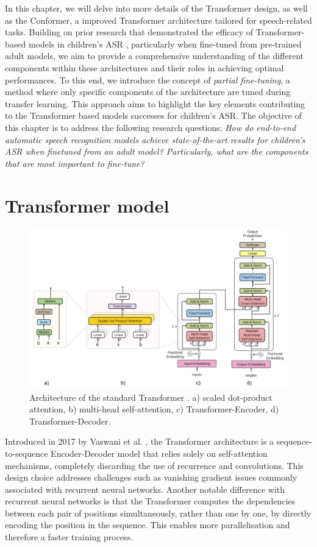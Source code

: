 In this chapter, we will delve into more details of the Transformer design, as well as the Conformer, a improved Transformer architecture tailored for speech-related tasks. Building on prior research that demonstrated the efficacy of Transformer-based models in children's \ac{ASR} \cite{gelin2021endtoend}, particularly when fine-tuned from pre-trained adult models, we aim to provide a comprehensive understanding of the different components within these architectures and their roles in achieving optimal performances. To this end, we introduce the concept of \textit{partial fine-tuning}, a method where only specific components of the architecture are tuned during transfer learning. This approach aims to highlight the key elements contributing to the Transformer based models successes for children's \ac{ASR}. The objective of this chapter is to address the following research questions: \textit{How do end-to-end automatic speech recognition models achieve state-of-the-art results for children's ASR when finetuned from an adult model?  Particularly, what are the components that are most important to fine-tune?}
\section{Transformer model}
\label{sec:trans_archi}

\begin{figure}[ht]
    \centering
    \includegraphics[width=1\textwidth]{imgs/Transformer_archi.png}
    \caption{Architecture of the standard Transformer \cite{vaswani2017attention}. a) scaled dot-product attention, b) multi-head self-attention, c) Transformer-Encoder, d) Transformer-Decoder.}
    \label{fig:Transformer_archi}
\end{figure}
Introduced in 2017 by Vaswani et al. \cite{vaswani2017attention}, the Transformer architecture is a sequence-to-sequence Encoder-Decoder model that relies solely on self-attention mechanisms, completely discarding the use of recurrence and convolutions. This design choice addresses challenges such as vanishing gradient issues commonly associated with recurrent neural networks. Another notable difference with recurrent neural networks is that the Transformer computes the dependencies between each pair of positions simultaneously, rather than one by one, by directly encoding the position in the sequence. This enables more parallelisation and therefore a faster training process.

